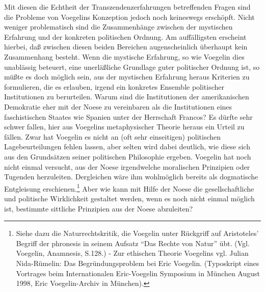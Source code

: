 Mit diesen die Echtheit der Transzendenzerfahrungen betreffenden Fragen sind
die Probleme von Voegelins Konzeption jedoch noch keineswegs erschöpft. Nicht
weniger problematisch sind die Zusammenhänge zwischen der mystischen Erfahrung
und der konkreten politischen Ordnung. Am auffälligsten erscheint hierbei, daß
zwischen diesen beiden Bereichen augenscheinlich überhaupt kein Zusammenhang
besteht. Wenn die mystische Erfahrung, so wie Voegelin dies unablässig
beteuert, eine unerläßliche Grundlage guter politischer Ordnung ist, so
müßte es doch möglich sein, aus der mystischen Erfahrung heraus Kriterien zu
formulieren, die es erlauben, irgend ein konkretes Ensemble politischer
Institutionen zu berurteilen. Warum sind die Institutionen der amerikanischen
Demokratie eher mit der Noese zu vereinbaren als die Institutionen eines
faschistischen Staates wie Spanien unter der Herrschaft Francos? Es dürfte
sehr schwer fallen, hier aus Voegelins metaphysischer Theorie heraus ein
Urteil zu fällen. Zwar hat Voegelin es nicht an (oft sehr einseitigen)
politischen Lagebeurteilungen fehlen lassen, aber selten wird dabei deutlich,
wie diese sich aus den Grundsätzen seiner politischen Philosophie ergeben.
Voegelin hat noch nicht einmal versucht, aus der Noese irgendwelche
moralischen Prinzipien oder Tugenden herzuleiten. Dergleichen wäre ihm
wohlmöglich bereits als dogmatische Entgleisung erschienen.\footnote{Siehe
  dazu die Naturrechtskritik, die Voegelin unter Rückgriff auf Aristoteles'
  Begriff der phronesis in seinem Aufsatz "`Das Rechte von Natur"' übt. (Vgl.
  Voegelin, Anamnesis, S.128.) - Zur ethischen Theorie Voegelins vgl. Julian
  Nida-Rümelin: Das Begründungsproblem bei Eric Voegelin. (Typoskript eines
  Vortrages beim Internationalen Eric-Voegelin Symposium in München August
  1998, Eric Voegelin-Archiv in München).} Aber wie kann mit Hilfe der Noese
die gesellschaftliche und politische Wirklichkeit gestaltet werden, wenn es
noch nicht einmal möglich ist, bestimmte sittliche Prinzipien aus der Noese
abzuleiten?



